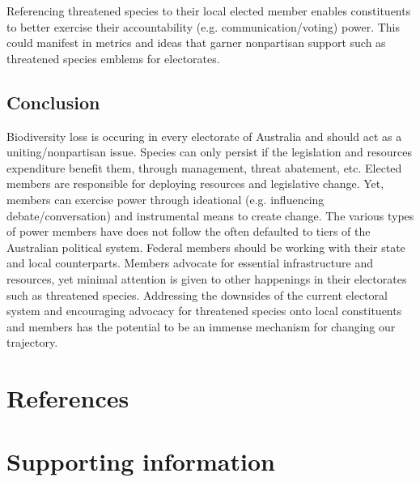 \documentclass[a4paper,11pt]{article}
\begin{document}
Referencing threatened species to their local elected member enables constituents to better exercise their accountability (e.g. communication/voting) power. This could manifest in metrics and ideas that garner nonpartisan support such as threatened species emblems for electorates. 




\subsection{Conclusion}

Biodiversity loss is occuring in every electorate of Australia and should act as a uniting/nonpartisan issue. Species can only persist if the legislation and resources expenditure benefit them, through management, threat abatement, etc. Elected members are responsible for deploying resources and legislative change. Yet, members can exercise power through ideational (e.g. influencing debate/conversation) and instrumental means to create change. The various types of power members have does not follow the often defaulted to tiers of the Australian political system. Federal members should be working with their state and local counterparts. Members advocate for essential infrastructure and resources, yet minimal attention is given to other happenings in their electorates such as threatened species. Addressing the downsides of the current electoral system and encouraging advocacy for threatened species onto local constituents and members has the potential to be an immense mechanism for changing our trajectory.

\newpage
\nolinenumbers
\section{References}
\printbibliography

\newpage
\section{Supporting information}
\end{document}
